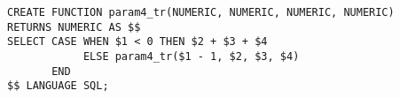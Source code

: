 \begin{verbatim}
CREATE FUNCTION param4_tr(NUMERIC, NUMERIC, NUMERIC, NUMERIC)
RETURNS NUMERIC AS $$
SELECT CASE WHEN $1 < 0 THEN $2 + $3 + $4
            ELSE param4_tr($1 - 1, $2, $3, $4)
       END
$$ LANGUAGE SQL;
\end{verbatim}